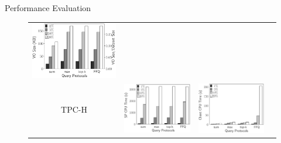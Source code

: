 \documentclass[xcolor={dvipsnames},aspectratio=169,10pt]{beamer}
\begin{document}
\begin{frame}{Performance Evaluation}
\begin{figure}
\begin{tabular}{c@{\quad}lll}
      \includegraphics[valign=m,totalheight=\ht\figbox]{exp-figs/aggregate-queries/foodmarket_vo.eps}
      \\
      TPC-H &
      \includegraphics[valign=m,totalheight=\ht\figbox]{exp-figs/aggregate-queries/tpch_sp.eps} &
      \includegraphics[valign=m,totalheight=\ht\figbox]{exp-figs/aggregate-queries/tpch_client.eps} &

\end{tabular}
\end{figure}
\end{frame}
\end{document}
